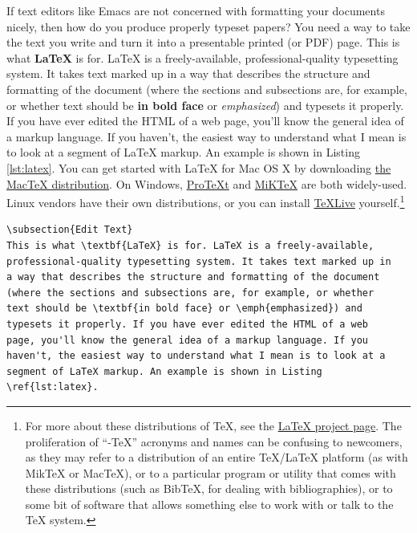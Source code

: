 \documentclass[11pt,article,oneside]{memoir}
\begin{document}
If text editors like Emacs are not concerned with formatting your
documents nicely, then how do you produce properly typeset papers? You
need a way to take the text you write and turn it into a presentable
printed (or PDF) page. This is what \textbf{\LaTeX{}} is for. \LaTeX{}
is a freely-available, professional-quality typesetting system. It
takes text marked up in a way that describes the structure and
formatting of the document (where the sections and subsections are,
for example, or whether text should be \textbf{in bold face} or
\emph{emphasized}) and typesets it properly. If you have ever edited
the HTML of a web page, you'll know the general idea of a markup
language. If you haven't, the easiest way to understand what I mean is
to look at a segment of \LaTeX{} markup. An example is shown in
Listing \ref{lst:latex}. You can get started with \LaTeX{} for Mac OS
X by downloading \href{http://tug.org/mactex/}{the MacTeX
  distribution}. On Windows,
\href{http://www.tug.org/protext/}{ProTeXt} and
\href{http://www.miktex.org/}{MiKTeX} are both widely-used. Linux
vendors have their own distributions, or you can install
\href{http://www.tug.org/texlive}{TeXLive} yourself.\footnote{For more
  about these distributions of \TeX{}, see the
  \href{http://www.latex-project.org/ftp.html}{\LaTeX{} project
    page}. The proliferation of ``-\TeX{}'' acronyms and names can be
  confusing to newcomers, as they may refer to a distribution of an
  entire \TeX{}/\LaTeX{} platform (as with MikTeX or MacTeX), or to a
  particular program or utility that comes with these distributions
  (such as BibTeX, for dealing with bibliographies), or to some bit of
  software that allows something else to work with or talk to the
  \TeX{} system. }

\begin{listing} 
\begin{verbatim}
\subsection{Edit Text} 
This is what \textbf{LaTeX} is for. LaTeX is a freely-available,
professional-quality typesetting system. It takes text marked up in
a way that describes the structure and formatting of the document
(where the sections and subsections are, for example, or whether
text should be \textbf{in bold face} or \emph{emphasized}) and
typesets it properly. If you have ever edited the HTML of a web
page, you'll know the general idea of a markup language. If you
haven't, the easiest way to understand what I mean is to look at a
segment of LaTeX markup. An example is shown in Listing
\ref{lst:latex}.
\end{verbatim}
\caption{Part of the \LaTeX\ source for an earlier version of this document.}
\label{lst:latex}
\end{listing}
\end{document}
